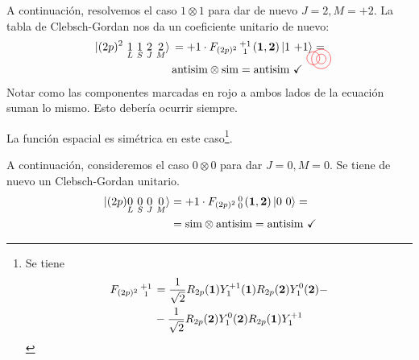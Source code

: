 A continuación, resolvemos el caso $1\otimes 1$ para dar de nuevo
$J=2,M=+2$. La tabla de Clebsch-Gordan nos da un coeficiente unitario
de nuevo:
\begin{equation}
  \begin{split}
    \ket*{(2p)^2\ 
      \underset{L}{1}\ \underset{S}{1}\ \underset{J}{2}\ \underset{M}{2}}\tikzmark{a} &=
    +1 \cdot F_{(2p)^2} \smqty{+1 \tikzmark{c}\\1} (\boldrm{1},\boldrm{2}) \ket{1
      \ {+1}\tikzmark{b}} = \\
    &\text{antisim} \otimes \text{sim} = \text{antisim} \ \checkmark
  \end{split}
  \tikz[overlay,remember picture]
  {
   \draw[color=red,thin] ([xshift=-10pt,yshift=3pt]a) circle (0.2cm); 
   \draw[color=red,thin] ([xshift=-3pt,yshift=2.3pt]b) circle (0.3cm);
   \draw[color=red,thin] ([xshift=-3pt,yshift=2.3pt]c) circle (0.15cm);
    }
\end{equation}
Notar como las componentes marcadas en rojo a ambos lados de la
ecuación suman lo mismo. Esto debería ocurrir siempre.

La función espacial es simétrica en este caso\footnote{ Se tiene 
  \begin{equation*}
    \textstyle
    \begin{split}
      F_{(2p)^2} \smqty{+1\\1} &= \frac{1}{\sqrt{2}}
      R_{2p}(\boldrm{1})Y_1^{+1}(\boldrm{1})
      R_{2p}(\boldrm{2})Y_1^0(\boldrm{2}) - \\
      &- \frac{1}{\sqrt{2}}
      R_{2p}(\boldrm{2})Y_1^{0}(\boldrm{2})
      R_{2p}(\boldrm{1})Y_1^{+1}
    \end{split}
  \end{equation*}
}.

A continuación, consideremos el caso $0\otimes 0$ para dar $J=0, M=0$.
Se tiene de nuevo un Clebsch-Gordan unitario.
\begin{equation}
  \begin{split}
    \ket*{(2p) \underset{L}{0}\ \underset{S}{0}\ \underset{J}{0}\
      \underset{M}{0}} &= +1 \cdot F_{(2p)^2} \smqty{0\\0}
    (\boldrm{1},\boldrm{2}) \ket{0 \ {0}} = \\
    &=\text{sim}\otimes \text{antisim} = \text{antisim} \ \checkmark
  \end{split}
\end{equation}

